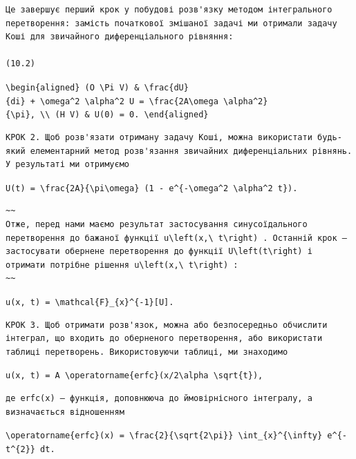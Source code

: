 \documentclass[
  ukrainian,
]{article}
\begin{document}
\begin{verbatim}
Це завершує перший крок у побудові розв'язку методом інтегрального перетворення: замість початкової змішаної задачі ми отримали задачу Коші для звичайного диференціального рівняння:

(10.2)
\end{verbatim}

\texttt{\textbackslash{}begin\{aligned\}\ (O\ \textbackslash{}Pi\ V)\ \&\ \textbackslash{}frac\{dU\}\{di\}\ +\ \textbackslash{}omega\^{}2\ \textbackslash{}alpha\^{}2\ U\ =\ \textbackslash{}frac\{2A\textbackslash{}omega\ \textbackslash{}alpha\^{}2\}\{\textbackslash{}pi\},\ \textbackslash{}\textbackslash{}\ (H\ V)\ \&\ U(0)\ =\ 0.\ \textbackslash{}end\{aligned\}}

\begin{verbatim}
КРОК 2. Щоб розв'язати отриману задачу Коші, можна використати будь-який елементарний метод розв'язання звичайних диференціальних рівнянь. У результаті ми отримуємо
\end{verbatim}

\texttt{U(t)\ =\ \textbackslash{}frac\{2A\}\{\textbackslash{}pi\textbackslash{}omega\}\ (1\ -\ e\^{}\{-\textbackslash{}omega\^{}2\ \textbackslash{}alpha\^{}2\ t\}).}

\begin{verbatim}
~~
Отже, перед нами маємо результат застосування синусоїдального перетворення до бажаної функції u\left(x,\ t\right) . Останній крок — застосувати обернене перетворення до функції U\left(t\right) і отримати потрібне рішення u\left(x,\ t\right) :
~~
\end{verbatim}

\texttt{u(x,\ t)\ =\ \textbackslash{}mathcal\{F\}\_\{x\}\^{}\{-1\}{[}U{]}.}

\begin{verbatim}
КРОК 3. Щоб отримати розв'язок, можна або безпосередньо обчислити інтеграл, що входить до оберненого перетворення, або використати таблиці перетворень. Використовуючи таблиці, ми знаходимо
\end{verbatim}

\texttt{u(x,\ t)\ =\ A\ \textbackslash{}operatorname\{erfc\}(x/2\textbackslash{}alpha\ \textbackslash{}sqrt\{t\}),}

\begin{verbatim}
де erfc(x) — функція, доповнююча до ймовірнісного інтегралу, а визначається відношенням
\end{verbatim}

\texttt{\textbackslash{}operatorname\{erfc\}(x)\ =\ \textbackslash{}frac\{2\}\{\textbackslash{}sqrt\{2\textbackslash{}pi\}\}\ \textbackslash{}int\_\{x\}\^{}\{\textbackslash{}infty\}\ e\^{}\{-t\^{}\{2\}\}\ dt.}
\end{document}
